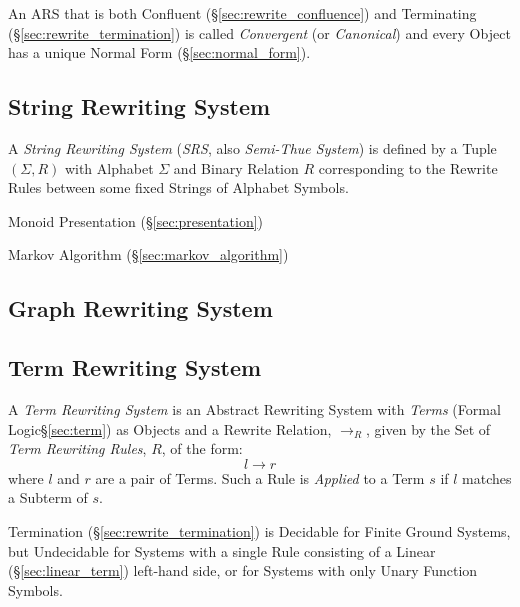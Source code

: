 An ARS that is both Confluent (\S\ref{sec:rewrite_confluence}) and
Terminating (\S\ref{sec:rewrite_termination}) is called \emph{Convergent} (or
\emph{Canonical}) and every Object has a unique Normal Form
(\S\ref{sec:normal_form}).



\subsection{String Rewriting System}\label{sec:string_rewriting}

A \emph{String Rewriting System} (\emph{SRS}, also \emph{Semi-Thue
  System}) is defined by a Tuple $(\Sigma, R)$ with Alphabet $\Sigma$
and Binary Relation $R$ corresponding to the Rewrite Rules between
some fixed Strings of Alphabet Symbols.

Monoid Presentation (\S\ref{sec:presentation})

Markov Algorithm (\S\ref{sec:markov_algorithm})



\subsection{Graph Rewriting System}\label{sec:graph_rewriting}

\subsection{Term Rewriting System}\label{sec:term_rewriting}

A \emph{Term Rewriting System} is an Abstract Rewriting System with
\emph{Terms} (Formal Logic\S\ref{sec:term}) as Objects and a Rewrite
Relation, $\rightarrow_R$, given by the Set of \emph{Term Rewriting
  Rules}, $R$, of the form:
\[
  l \rightarrow r
\]
where $l$ and $r$ are a pair of Terms. Such a Rule is \emph{Applied}
to a Term $s$ if $l$ matches a Subterm of $s$.

Termination (\S\ref{sec:rewrite_termination}) is Decidable for Finite Ground
Systems, but Undecidable for Systems with a single Rule consisting of
a Linear (\S\ref{sec:linear_term}) left-hand side, or for Systems with
only Unary Function Symbols. %



